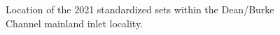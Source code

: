 \documentclass[12pt]{article}\usepackage[]{graphicx}\usepackage[]{color}
\begin{document}
\begin{figure}[htb]

{\centering {} 

}

\caption{Location of the 2021 standardized sets within the Dean/Burke Channel mainland inlet locality.}\label{fig:figure5}
\end{figure}
\clearpage
\end{document}
